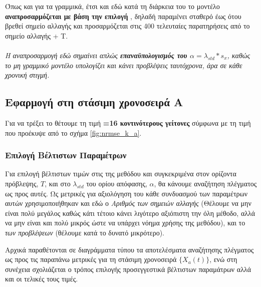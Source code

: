 \par Όπως και για τα γραμμικά, έτσι και εδώ κατά τη διάρκεια του  το μοντέλο \textbf{αναπροσαρμόζεται με βάση την επιλογή }, δηλαδή παραμένει σταθερό έως ότου βρεθεί σημείο αλλαγής και προσαρμόζεται στις 400 τελευταίες παρατηρήσεις από το σημείο αλλαγής + T. 
\\ \\\textit{Η αναπροσαρμογή εδώ σημαίνει απλώς \textbf{επαναϋπολογισμός του $\alpha=\lambda_{std}*s_x$}, καθώς το μη γραμμικό μοντέλο υπολογίζει και κάνει προβλέψεις ταυτόχρονα, άρα σε κάθε χρονική στιγμή.}

\subsection{Εφαρμογή στη στάσιμη χρονοσειρά Α}

Για να τρέξει το  θέτουμε τη τιμή \textbf{=16 κοντινότερους γείτονες} σύμφωνα με τη τιμή που προέκυψε από το σχήμα \ref{fig:nrmse_k_a}.

\subsubsection{Επιλογή Βέλτιστων Παραμέτρων}

Για επιλογή βέλτιστων τιμών στις  της μεθόδου και συγκεκριμένα στον ορίζοντα πρόβλεψης, $T$, και στο $\lambda_{std}$ του ορίου απόφασης, $\alpha$, θα κάνουμε αναζήτηση πλέγματος ως προς αυτές. Ως μετρικές για αξιολόγηση του κάθε συνδυασμού των παραμέτρων αυτών χρησιμοποιήθηκαν και εδώ ο \textit{Αριθμός των σημειών αλλαγής } (Θέλουμε να μην είναι πολύ μεγάλος καθώς κάτι τέτοιο κάνει λιγότερο αξιόπιστη την όλη μέθοδο, αλλά να μην είναι και πολύ μικρός ώστε να υπάρχει νόημα χρήσης της μεθόδου), και το \textit{ των προβλέψεων} (θέλουμε κατά το δυνατό μικρότερο).

Αρχικά παραθέτονται σε διαγράμματα τύπου  τα αποτελέσματα αναζήτησης πλέγματος ως προς τις παραπάνω μετρικές για τη στάσιμη χρονοσειρά $\{X_a(t)\}$, ενώ στη συνέχεια σχολιάζεται ο τρόπος επιλογής προσεγγεστικά βέλτιστων παραμάτρων αλλά και οι τελικές τους τιμές.

